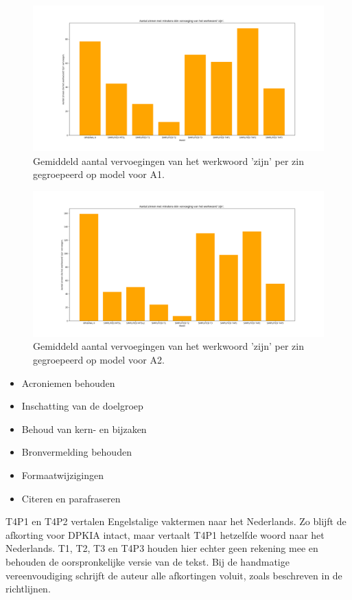 \begin{figure}
	\includegraphics[width=\linewidth]{img/boxplot-tobe-a1.png}
	\caption{Gemiddeld aantal vervoegingen van het werkwoord 'zijn' per zin gegroepeerd op model voor A1.}
	\label{img:histplot-tobe-a1}
\end{figure}

\begin{figure}
	\includegraphics[width=\linewidth]{img/boxplot-tobe-a2.png}
	\caption{Gemiddeld aantal vervoegingen van het werkwoord 'zijn' per zin gegroepeerd op model voor A2.}
	\label{img:histplot-tobe-a2}
\end{figure}


\begin{itemize}
	\item Acroniemen behouden
	\item Inschatting van de doelgroep
	\item Behoud van kern- en bijzaken
	\item Bronvermelding behouden
	\item Formaatwijzigingen
	\item Citeren en parafraseren
\end{itemize}


T4P1 en T4P2 vertalen Engelstalige vaktermen naar het Nederlands. Zo blijft de afkorting voor DPKIA intact, maar vertaalt T4P1 hetzelfde woord naar het Nederlands.  T1, T2, T3 en T4P3 houden hier echter geen rekening mee en behouden de oorspronkelijke versie van de tekst. Bij de handmatige vereenvoudiging schrijft de auteur alle afkortingen voluit, zoals beschreven in de richtlijnen. %

